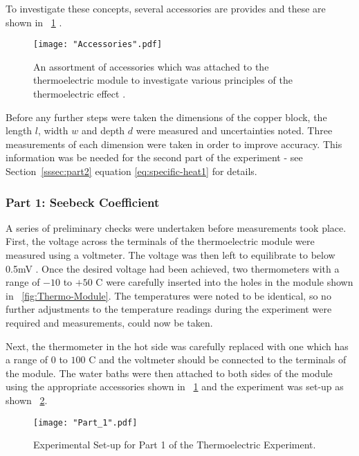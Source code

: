 \documentclass{article}
\newcommand{\figref}[2][\figurename~]{#1\ref{#2}}
\newcommand{\secref}[2][Section~]{#1\ref{#2}}
\begin{document}
\vspace{2mm}  
\noindent
To investigate these concepts, several accessories are provides and these are shown in \figref{fig:accessories} \cite{Paper02}.

\begin{figure}[h]
\centering
\texttt{[image: "Accessories".pdf]}
\caption{An assortment of accessories which was attached to the thermoelectric module to investigate various principles of the thermoelectric effect \cite{Paper02}.}
\label{fig:accessories}
\end{figure}

\newpage
\vspace{2mm}  
\noindent    
Before any further steps were taken the dimensions of the copper block, the length $l$, width $w$ and depth $d$ were measured and uncertainties noted. Three measurements of each dimension were taken in order to improve accuracy. This information was be needed for the second part of the experiment - see \secref{sssec:part2} equation \eqref{eq:specific-heat1} for details.

\subsubsection{Part 1: Seebeck Coefficient}
\label{sssec:part1}

A series of preliminary checks were undertaken before measurements took place. First, the voltage across the terminals of the thermoelectric module were measured using a voltmeter. The voltage was then left to equilibrate to below 0.5mV \cite{Paper02}. Once the desired voltage had been achieved, two thermometers with a range of $-10$ to $+50$ C were carefully inserted into the holes in the module shown in \figref{fig:Thermo-Module}. The temperatures were noted to be identical, so no further adjustments to the temperature readings during the experiment were required and measurements, could now be taken.

\vspace{2mm}  
\noindent
Next, the thermometer in the hot side was carefully replaced with one which has a range of $0$ to $100$ C and the voltmeter should be connected to the terminals of the module. The water baths were then attached to both sides of the module using the appropriate accessories shown in \figref{fig:accessories} and the experiment was set-up as shown \figref{fig:part1}.

\begin{figure}[h]
\centering
\texttt{[image: "Part\_1".pdf]}
\caption{Experimental Set-up for Part 1 of the Thermoelectric Experiment.}
\label{fig:part1}
\end{figure}
\end{document}
